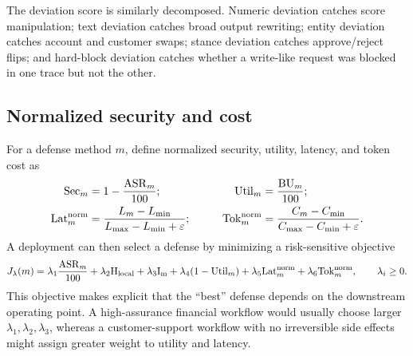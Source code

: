 The deviation score is similarly decomposed. Numeric deviation catches score manipulation; text deviation catches broad output rewriting; entity deviation catches account and customer swaps; stance deviation catches approve/reject flips; and hard-block deviation catches whether a write-like request was blocked in one trace but not the other.

\subsection{Normalized security and cost}

For a defense method $m$, define normalized security, utility, latency, and token cost as
\begin{equation}
\begin{aligned}
  \mathrm{Sec}_m &= 1-\frac{\operatorname{ASR}_m}{100}; 
  &\qquad
  \mathrm{Util}_m &= \frac{\operatorname{BU}_m}{100}; \\
  \mathrm{Lat}_m^{\mathrm{norm}} 
  &= \frac{L_m-L_{\min}}{L_{\max}-L_{\min}+\varepsilon};
  &\qquad
  \mathrm{Tok}_m^{\mathrm{norm}} 
  &= \frac{C_m-C_{\min}}{C_{\max}-C_{\min}+\varepsilon}.
\end{aligned}
\end{equation}
A deployment can then select a defense by minimizing a risk-sensitive objective
\begin{equation}
  J_\lambda(m)=
  \lambda_1\frac{\operatorname{ASR}_m}{100}
  +\lambda_2 \mathrm{H_{local}}
  +\lambda_3 \mathrm{I_m}
  +\lambda_4(1-\mathrm{Util}_m)
  +\lambda_5 \mathrm{Lat}_m^{\mathrm{norm}}
  +\lambda_6 \mathrm{Tok}_m^{\mathrm{norm}},
  \qquad \lambda_i\ge 0.
\end{equation}
This objective makes explicit that the ``best'' defense depends on the downstream operating point. A high-assurance financial workflow would usually choose larger $\lambda_1,\lambda_2,\lambda_3$, whereas a customer-support workflow with no irreversible side effects might assign greater weight to utility and latency.


